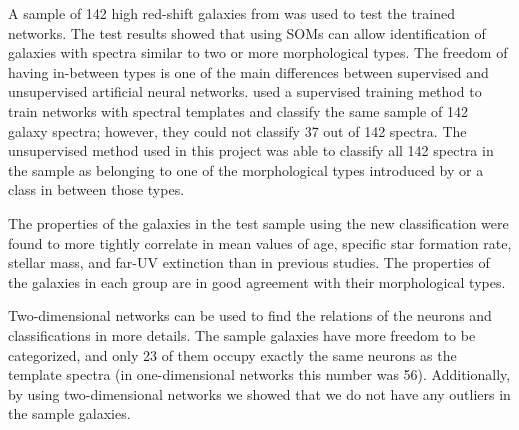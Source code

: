 A sample of 142 high red-shift galaxies from  was used to test the trained networks.
The test results showed that using SOMs can allow identification of galaxies with spectra similar to two or more morphological types.%
The freedom of having in-between types is one of the main differences between supervised and unsupervised artificial neural networks.
 used a supervised training method to train networks with  spectral templates and classify the same sample of 142 galaxy spectra;
however, they could not classify 37 out of 142 spectra.
The unsupervised method used in this project was able to classify all 142 spectra in the sample
as belonging to one of the morphological types introduced by  or a class in between those types.

The properties of the galaxies in the test sample using the new
classification were found to more tightly correlate in mean values of age, specific star formation rate, stellar mass, and far-UV extinction than in previous studies. 
The properties of the galaxies in each group are in good agreement with their morphological types.

Two-dimensional networks can be used to find the relations of the neurons and classifications in more details.
The sample galaxies have more freedom to be categorized, and only 23 of them occupy exactly the same neurons as the  template spectra (in one-dimensional networks this number was 56).
Additionally, by using two-dimensional networks we showed that we do not have any outliers in the sample galaxies.




